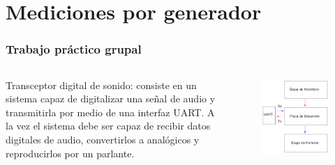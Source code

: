 \section{Mediciones por generador}
\begin{frame}
\frametitle{Trabajo práctico grupal}

\begin{columns}[t]

Transceptor digital de sonido: consiste en un sistema capaz de digitalizar una señal de audio y transmitirla por medio de una interfaz UART. A la vez el sistema debe ser capaz de recibir datos digitales de audio, convertirlos a analógicos y reproducirlos por un parlante.
		
		\begin{figure}
			\centering
			\includegraphics[scale=0.3]{diag1}	
		\end{figure}
	\end{columns}
\end{frame}

